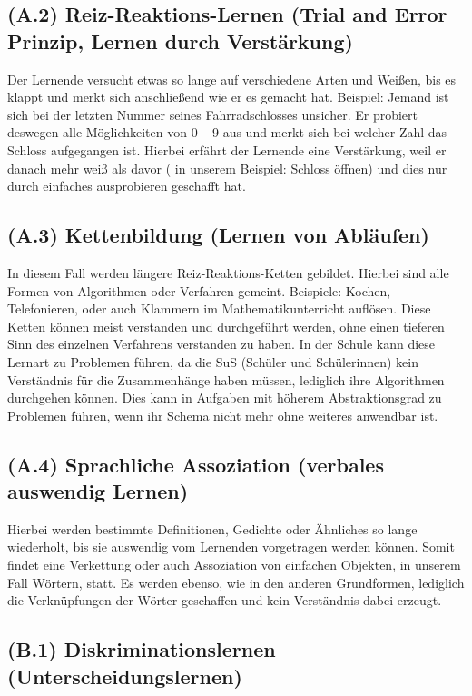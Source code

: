 \subsection[]{(A.2) Reiz-Reaktions-Lernen (Trial and Error Prinzip, Lernen durch Verstärkung)}

Der Lernende versucht etwas so lange auf verschiedene Arten und Weißen, bis es klappt und merkt sich anschließend wie er es gemacht hat. 
Beispiel: Jemand ist sich bei der letzten Nummer seines Fahrradschlosses unsicher. Er probiert deswegen  alle Möglichkeiten von 0 – 9 aus und merkt sich bei welcher Zahl das Schloss aufgegangen ist. Hierbei erfährt der Lernende eine Verstärkung, weil er danach mehr weiß als davor ( in unserem Beispiel: Schloss öffnen) und dies nur durch einfaches ausprobieren geschafft hat\cite{zech1983grundkurs}.

\subsection[]{(A.3) Kettenbildung (Lernen von Abläufen)}

In diesem Fall werden längere Reiz-Reaktions-Ketten gebildet. Hierbei sind alle Formen von Algorithmen oder Verfahren gemeint. Beispiele: Kochen, Telefonieren, oder auch Klammern im Mathematikunterricht auflösen. Diese Ketten können meist verstanden und durchgeführt werden, ohne einen tieferen Sinn des einzelnen Verfahrens verstanden zu haben. In der Schule kann diese Lernart zu Problemen führen, da die SuS (Schüler und Schülerinnen) kein Verständnis für die Zusammenhänge haben müssen, lediglich ihre Algorithmen durchgehen können. Dies kann in Aufgaben mit höherem Abstraktionsgrad zu Problemen führen, wenn ihr Schema nicht mehr ohne weiteres anwendbar ist.

\subsection[]{(A.4) Sprachliche Assoziation (verbales auswendig Lernen)}

Hierbei werden bestimmte Definitionen, Gedichte oder Ähnliches so lange wiederholt, bis sie auswendig vom Lernenden vorgetragen werden können. Somit findet eine Verkettung oder auch Assoziation von einfachen Objekten, in unserem Fall Wörtern, statt. Es werden ebenso, wie in den anderen Grundformen, lediglich die Verknüpfungen der Wörter geschaffen und kein Verständnis dabei erzeugt\cite{zech1983grundkurs}. 

\subsection[]{(B.1) Diskriminationslernen (Unterscheidungslernen)}

